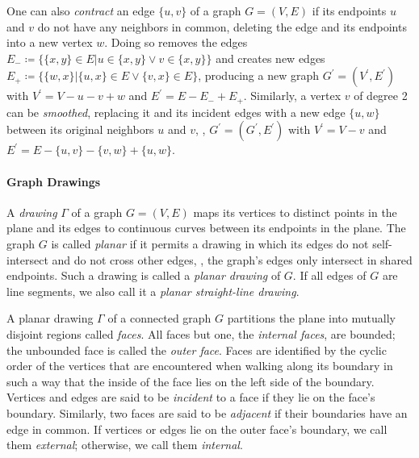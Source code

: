 One can also \emph{contract} an edge $\{u,v\}$ of a graph $G = (V, E)$ if its endpoints $u$ and $v$ do not have any neighbors in common, deleting the edge and  its endpoints into a new vertex $w$.
Doing so removes the edges $E_- \coloneqq \{ \{x,y\} \in E \vert u \in \{x,y\} \lor v \in \{x,y\} \}$ and creates new edges $E_+ \coloneqq \{ \{w,x\} \vert \{u,x\} \in E \lor \{v,x\} \in E \}$, producing a new graph $G^\prime = (V^\prime, E^\prime)$ with $V^\prime = V - u - v + w$ and $E^\prime = E - E_- + E_+$.
Similarly, a vertex $v$ of degree 2 can be \emph{smoothed}, replacing it and its incident edges with a new edge $\{u,w\}$ between its original neighbors $u$ and $v$, \ie{}, $G^\prime = (G^\prime, E^\prime)$ with $V^\prime = V - v$ and $E^\prime = E - \{u,v\} - \{v,w\} + \{u,w\}$.



\paragraph{Graph Drawings}


A \emph{drawing} $\Gamma$ of a graph $G = (V, E)$ maps its vertices to distinct points in the plane and its edges to continuous curves between its endpoints in the plane.
The graph $G$ is called \emph{planar} if it permits a drawing in which its edges do not self-intersect and do not cross other edges, \ie{}, the graph's edges only intersect in shared endpoints.
Such a drawing is called a \emph{planar drawing} of $G$.
If all edges of $G$ are line segments, we also call it a \emph{planar straight-line drawing}.

A planar drawing $\Gamma$ of a connected graph $G$ partitions the plane into mutually disjoint regions called \emph{faces}.
All faces but one, the \emph{internal faces}, are bounded; the unbounded face is called the \emph{outer face}.
Faces are identified by the cyclic order of the vertices that are encountered when walking along its boundary \cite{angelini2015monotone} in such a way that the inside of the face lies on the left side of the boundary.
Vertices and edges are said to be \emph{incident} to a face if they lie on the face's boundary.
Similarly, two faces are said to be \emph{adjacent} if their boundaries have an edge in common.
If vertices or edges lie on the outer face's boundary, we call them \emph{external}; otherwise, we call them \emph{internal}.

